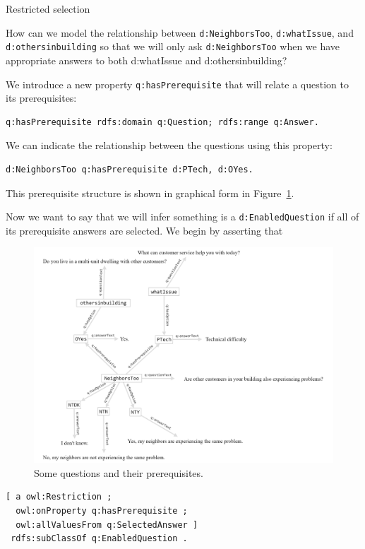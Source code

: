 \begin{challenge}{Restricted selection}
\label{chal:26}

How can we model the relationship between \texttt{d:NeighborsToo}, \texttt{d:whatIssue},
and \texttt{d:othersinbuilding} so that we will only ask \texttt{d:NeighborsToo} when we
have appropriate answers to both d:whatIssue and d:othersinbuilding?

We introduce a new property \texttt{q:hasPrerequisite} that will relate a
question to its prerequisites:

\begin{lstlisting}
q:hasPrerequisite rdfs:domain q:Question; rdfs:range q:Answer.
\end{lstlisting}

We can indicate the relationship between the questions using this
property:

\begin{lstlisting}
d:NeighborsToo q:hasPrerequisite d:PTech, d:OYes.
\end{lstlisting}

This prerequisite structure is shown in graphical form in Figure~\ref{fig:ch12.07}.

Now we want to say that we will infer something is a \texttt{d:EnabledQuestion}
if all of its prerequisite answers are selected. We begin by asserting
that

\begin{figure}
\centering
\includegraphics[width=5in]{SWWOv3/media/ch12/figure12-7.png}
\caption{Some questions and their prerequisites.}
\label{fig:ch12.07}
\end{figure}


\begin{lstlisting}
[ a owl:Restriction ;
  owl:onProperty q:hasPrerequisite ;
  owl:allValuesFrom q:SelectedAnswer ]
 rdfs:subClassOf q:EnabledQuestion .
\end{lstlisting}


\end{challenge}
